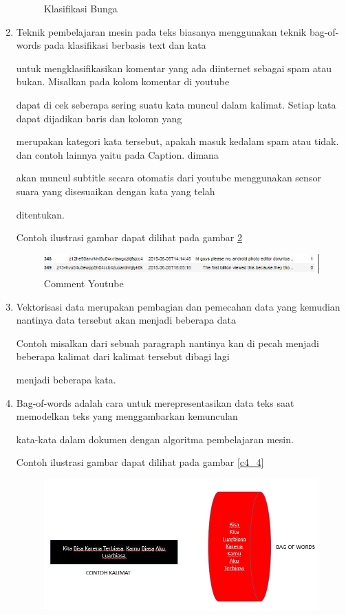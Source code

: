 \begin{enumerate}
\begin{figure}[ht]
	\caption{Klasifikasi Bunga}
	\label{c4_2}
\end{figure}
\item Teknik pembelajaran mesin pada teks biasanya menggunakan teknik bag-of-words pada klasifikasi berbasis text dan kata 
\par untuk mengklasifikasikan komentar yang ada diinternet sebagai spam atau bukan. Misalkan pada kolom komentar di youtube
\par dapat di cek seberapa sering suatu kata muncul dalam kalimat. Setiap kata dapat dijadikan baris dan kolomn yang 
\par merupakan kategori kata tersebut, apakah masuk kedalam spam atau tidak. dan contoh lainnya yaitu pada Caption. dimana
\par akan muncul subtitle secara otomatis dari youtube menggunakan sensor suara yang disesuaikan dengan kata yang telah 
\par ditentukan. 
\par Contoh ilustrasi gambar dapat dilihat pada gambar \ref{c4_3}
\begin{figure}[ht]
	\centerline{\includegraphics[width=1\textwidth]{figures/huda/chapter4/3.JPG}}
	\caption{Comment Youtube}
	\label{c4_3}
\end{figure}
\item Vektorisasi data merupakan pembagian dan pemecahan data yang kemudian nantinya data tersebut akan menjadi beberapa data
\par Contoh misalkan dari sebuah paragraph nantinya kan di pecah menjadi beberapa kalimat dari kalimat tersebut dibagi lagi
\par menjadi beberapa kata.
\item Bag-of-words adalah cara untuk merepresentasikan data teks saat memodelkan teks yang menggambarkan kemunculan 
\par kata-kata dalam dokumen dengan algoritma pembelajaran mesin.
\par Contoh ilustrasi gambar dapat dilihat pada gambar \ref{c4_4}
\begin{figure}[ht]
	\centerline{\includegraphics[width=1\textwidth]{figures/huda/chapter4/4.JPG}}

\end{figure}
\end{enumerate}
